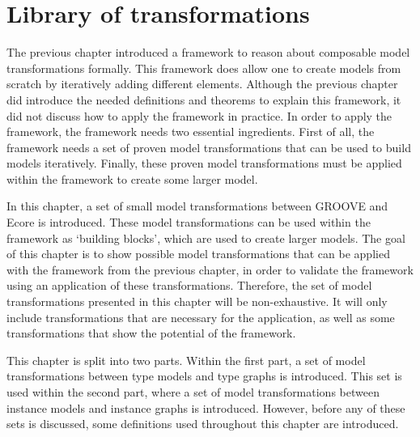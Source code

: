 \chapter{Library of transformations}
\label{chapter:library_of_transformations}

The previous chapter introduced a framework to reason about composable model transformations formally. This framework does allow one to create models from scratch by iteratively adding different elements. Although the previous chapter did introduce the needed definitions and theorems to explain this framework, it did not discuss how to apply the framework in practice. In order to apply the framework, the framework needs two essential ingredients. First of all, the framework needs a set of proven model transformations that can be used to build models iteratively. Finally, these proven model transformations must be applied within the framework to create some larger model.

In this chapter, a set of small model transformations between GROOVE and Ecore is introduced. These model transformations can be used within the framework as `building blocks', which are used to create larger models. The goal of this chapter is to show possible model transformations that can be applied with the framework from the previous chapter, in order to validate the framework using an application of these transformations. Therefore, the set of model transformations presented in this chapter will be non-exhaustive. It will only include transformations that are necessary for the application, as well as some transformations that show the potential of the framework.

This chapter is split into two parts. Within the first part, a set of model transformations between type models and type graphs is introduced. This set is used within the second part, where a set of model transformations between instance models and instance graphs is introduced. However, before any of these sets is discussed, some definitions used throughout this chapter are introduced.



